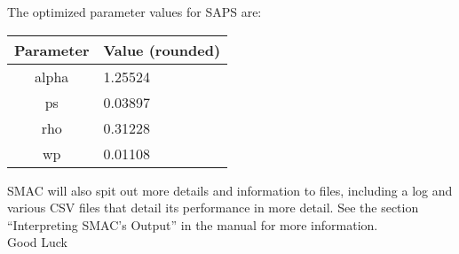 \documentclass[11pt,letterpaper,twoside]{article}
\begin{document}
The optimized parameter values for SAPS are:
\begin{center}
\begin{tabular}{ c | l }
Parameter & Value (rounded) \\
\hline
\hline
alpha & 1.25524 \\
\hline 
ps & 0.03897 \\
\hline
rho & 0.31228 \\
\hline
wp & 0.01108 \\
\hline 
\end{tabular}
\end{center}

SMAC will also spit out more details and information to files, including a log and various CSV files that detail its performance in more detail. See the section ``Interpreting SMAC's Output'' in the manual for more information.  \\
Good Luck \Smiley




%

%
%

\footnotesize{
%

}
\end{document}
